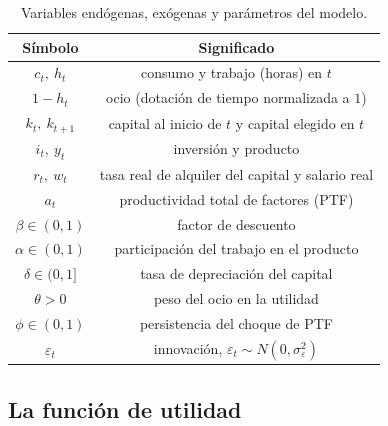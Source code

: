 \documentclass[11pt,a4paper]{report}
\begin{document}
\begin{table}[H]
\centering\small
\begin{tabular}{cc}
\toprule
\textbf{Símbolo} & \textbf{Significado} \\
\midrule
$c_t,\ h_t$ & consumo y trabajo (horas) en $t$ \\
$1-h_t$ & ocio (dotación de tiempo normalizada a $1$) \\
$k_t,\ k_{t+1}$ & capital al inicio de $t$ y capital elegido en $t$ \\
$i_t,\ y_t$ & inversión y producto \\
$r_t,\ w_t$ & tasa real de alquiler del capital y salario real \\
$a_t$ & productividad total de factores (PTF) \\
$\beta\in(0,1)$ & factor de descuento \\
$\alpha\in(0,1)$ & participación del trabajo en el producto \\
$\delta\in(0,1]$ & tasa de depreciación del capital \\
$\theta>0$ & peso del ocio en la utilidad \\
$\phi\in(0,1)$ & persistencia del choque de PTF \\
$\varepsilon_t$ & innovación, $\varepsilon_t\sim N(0,\sigma_\varepsilon^2)$ \\
\bottomrule
\end{tabular}
\caption{Variables endógenas, exógenas y parámetros del modelo.}
\label{tab:vars}
\end{table}

\subsection{La función de utilidad}
\label{sec:utilidad}
\end{document}

